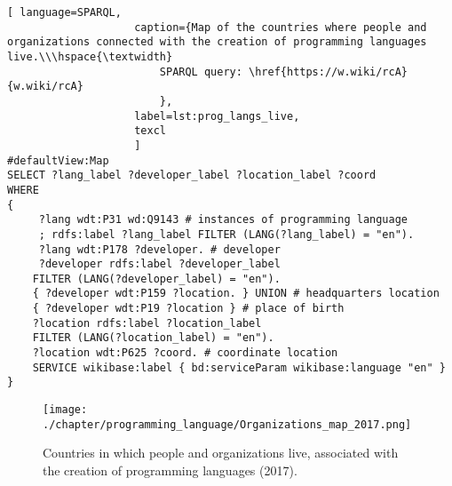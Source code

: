\begin{lstlisting}[ language=SPARQL, 
                    caption={Map of the countries where people and organizations connected with the creation of programming languages live.\\\hspace{\textwidth}
                        SPARQL query: \href{https://w.wiki/rcA}{w.wiki/rcA}
                        },
                    label=lst:prog_langs_live,
                    texcl 
                    ]
#defaultView:Map
SELECT ?lang_label ?developer_label ?location_label ?coord
WHERE
{
	 ?lang wdt:P31 wd:Q9143 # instances of programming language
	 ; rdfs:label ?lang_label FILTER (LANG(?lang_label) = "en"). 
	 ?lang wdt:P178 ?developer. # developer
	 ?developer rdfs:label ?developer_label
	FILTER (LANG(?developer_label) = "en"). 
	{ ?developer wdt:P159 ?location. } UNION # headquarters location
	{ ?developer wdt:P19 ?location } # place of birth
	?location rdfs:label ?location_label 
	FILTER (LANG(?location_label) = "en").
 	?location wdt:P625 ?coord. # coordinate location
 	SERVICE wikibase:label { bd:serviceParam wikibase:language "en" } 	
}
\end{lstlisting}%

\label{question:prog_lang_2}

\begin{figure}[h]
\centering
	\texttt{[image: ./chapter/programming\_language/Organizations\_map\_2017.png]}
	\caption{Countries in which people and organizations live, associated with the creation of programming languages (2017).}
	\label{fig:organizations_2017}
\end{figure}

